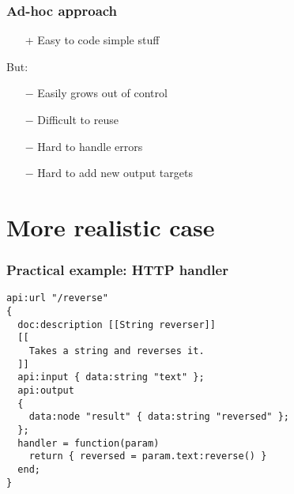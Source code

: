\documentclass[handout]{beamer}
\begin{document}
\begin{frame}

\frametitle{Ad-hoc approach}

\begin{itemize}
\item[+] Easy to code simple stuff
\end{itemize}

But:

\begin{itemize}
\item[$-$] Easily grows out of control
\item[$-$] Difficult to reuse
\item[$-$] Hard to handle errors
\item[$-$] Hard to add new output targets
\end{itemize}

\end{frame}


\section{More realistic case}


\begin{frame}[fragile]

\frametitle{Practical example: HTTP handler}

\begin{verbatim}
api:url "/reverse"
{
  doc:description [[String reverser]]
  [[
    Takes a string and reverses it.
  ]]
  api:input { data:string "text" };
  api:output
  {
    data:node "result" { data:string "reversed" };
  };
  handler = function(param)
    return { reversed = param.text:reverse() }
  end;
}
\end{verbatim}

\end{frame}

\end{document}
